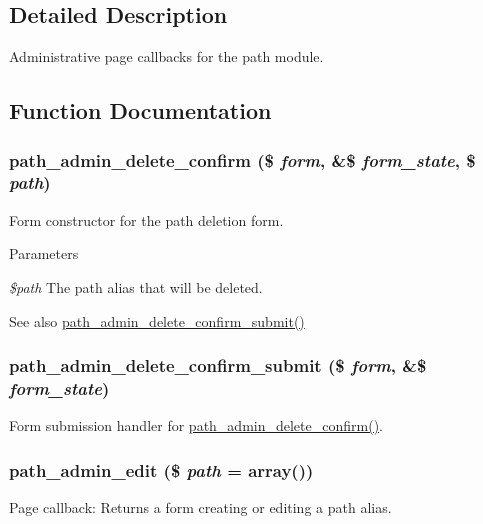 \subsection{Detailed Description}
Administrative page callbacks for the path module. 

\subsection{Function Documentation}
\hypertarget{path_8admin_8inc_adb99300f9234551a6cbe35475e71d55d}{
\subsubsection[{path\_\-admin\_\-delete\_\-confirm}]{\setlength{\rightskip}{0pt plus 5cm}path\_\-admin\_\-delete\_\-confirm (\$ {\em form}, \/  \&\$ {\em form\_\-state}, \/  \$ {\em path})}}
\label{path_8admin_8inc_adb99300f9234551a6cbe35475e71d55d}
Form constructor for the path deletion form.


\begin{DoxyParams}{Parameters}
\item[{\em \$path}]The path alias that will be deleted.\end{DoxyParams}
\begin{DoxySeeAlso}{See also}
\hyperlink{path_8admin_8inc_a11e17265eec5e2e31acf2c251f270e78}{path\_\-admin\_\-delete\_\-confirm\_\-submit()} 
\end{DoxySeeAlso}
\hypertarget{path_8admin_8inc_a11e17265eec5e2e31acf2c251f270e78}{
\subsubsection[{path\_\-admin\_\-delete\_\-confirm\_\-submit}]{\setlength{\rightskip}{0pt plus 5cm}path\_\-admin\_\-delete\_\-confirm\_\-submit (\$ {\em form}, \/  \&\$ {\em form\_\-state})}}
\label{path_8admin_8inc_a11e17265eec5e2e31acf2c251f270e78}
Form submission handler for \hyperlink{path_8admin_8inc_adb99300f9234551a6cbe35475e71d55d}{path\_\-admin\_\-delete\_\-confirm()}. \hypertarget{path_8admin_8inc_aa1b0bbde16c010de5f5e617ff83eb14d}{
\subsubsection[{path\_\-admin\_\-edit}]{\setlength{\rightskip}{0pt plus 5cm}path\_\-admin\_\-edit (\$ {\em path} = {\ttfamily array()})}}
\label{path_8admin_8inc_aa1b0bbde16c010de5f5e617ff83eb14d}
Page callback: Returns a form creating or editing a path alias.



